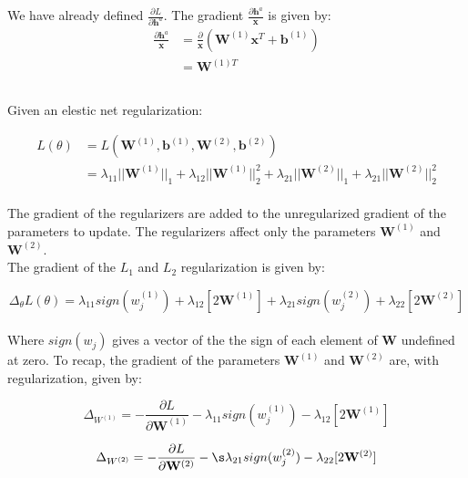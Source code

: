 \documentclass[reqno]{amsart}
\theoremstyle{definition}
\theoremstyle{remark}
\numberwithin{equation}{section}
\begin{document}
We have already defined $\frac{\partial L}{\partial \mathbf{h}^a}$. The gradient $\frac{\partial \mathbf{h}^a}{ \mathbf{x}}$ is given by: \\

\begin{align}
    \frac{\partial \mathbf{h}^a}{ \mathbf{x}} &= \frac{\partial}{\mathbf{x}} (\mathbf{W}^{(1)} \mathbf{x}^T+ \mathbf{b}^{(1)}) \\
    &= \mathbf{W}^{(1)T}
\end{align}

\subsection{}
Given an elestic net regularization: 

\begin{align}
    L(\theta) &= L(\mathbf{W}^{(1)}, \mathbf{b}^{(1)}, \mathbf{W}^{(2)}, \mathbf{b}^{(2)}) \\
    &= \lambda_{11} ||\mathbf{W}^{(1)}||_1 + \lambda_{12} ||\mathbf{W}^{(1)}||_2^2 + \lambda_{21} ||\mathbf{W}^{(2)}||_1 + \lambda_{21} ||\mathbf{W}^{(2)}||_2^2
\end{align}\\

The gradient of the regularizers are added to the unregularized gradient of the parameters to update. The regularizers affect only the parameters $\mathbf{W}^{(1)}$ and $\mathbf{W}^{(2)}$. \\

The gradient of the $L_1$ and $L_2$ regularization is given by:

\begin{equation}
    \Delta_\theta L(\theta) = \lambda_{11}sign(w^{(1)}_j) + \lambda_{12}[2\mathbf{W}^{(1)}] +\lambda_{21}sign(w^{(2)}_j) + \lambda_{22}[2\mathbf{W}^{(2)}]
\end{equation}\\

Where $sign(w_j)$ gives a vector of the the sign of each element of $\mathbf{W}$ undefined at zero. To recap, the gradient of the parameters $\mathbf{W}^{(1)}$ and $\mathbf{W}^{(2)}$ are, with regularization, given by:

\begin{equation}
    \Delta_{W^{(1)}} = - \frac{\partial L}{\partial \mathbf{W}^{(1)}} - \lambda_{11}sign(w^{(1)}_j) - \lambda_{12}[2\mathbf{W}^{(1)}]
\end{equation}

\begin{equation}
    \Delta_{W^{(2)}} = - \frac{\partial L}{\partial \mathbf{W}^{(2)}} - \s\lambda_{21}sign(w^{(2)}_j) - \lambda_{22}[2\mathbf{W}^{(2)}]
\end{equation}
\end{document}
